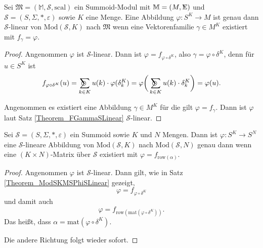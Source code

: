 \documentclass{article}
\DeclareMathOperator*{\Sigmacirc}{%
  \ThisStyle{\mathop{\ensurestackMath{\stackinset{c}{-0.75\LMpt}{c}{}{%
  \rotatebox[origin=lb]{-90}{$\circ$}}{\SavedStyle\Sigma}}}}}
\DeclareMathOperator*{\sumcirc}{%
  \ThisStyle{\mathop{\ensurestackMath{\stackinset{c}{-1.5\LMpt}{c}{}{%
  \rotatebox[origin=lb]{-90}{$\SavedStyle\scalerel*{\bm\Circle}{%
  i}$}}{\SavedStyle\sum}}}}}
\begin{document}
\begin{theorem}\label{Theorem_ModSKMSPhiSLinear}
  Sei $\mathfrak{M} = (\mathbb{M}, \mathcal{S}, \text{scal})$ ein Summoid-Modul
  mit $\mathbb{M} = (M, \Sigmacirc)$ und $\mathcal{S} = (S, \Sigma, \ast, \varepsilon)$
  sowie $K$ eine Menge.
  Eine Abbildung $\varphi \colon S^K \to M$ ist genau dann $\mathcal{S}$-linear von
  $\text{Mod}(\mathcal{S}, K)$ nach $\mathfrak{M}$ wenn eine Vektorenfamilie
  $\gamma \in M^K$ existiert mit $f_\gamma = \varphi$.
\end{theorem}
\begin{proof}
  Angenommen $\varphi$ ist $\mathcal{S}$-linear.
  Dann ist $\varphi = f_{\varphi \circ \delta^K}$, also $\gamma = \varphi \circ \delta^K$,
  denn für $u \in S^K$ ist
  \begin{equation*}
    f_{\varphi \circ \delta^K}(u)
    = \sumcirc_{k \in K} u(k) \cdot \varphi(\delta^K_k)
    = \varphi \bigg( \sumcirc_{k \in K} u(k) \cdot \delta^K_k \bigg)
    = \varphi(u).
  \end{equation*}

  Angenommen es existiert eine Abbildung $\gamma \in M^K$ für die gilt $\varphi = f_\gamma$.
  Dann ist $\varphi$ laut Satz \ref{Theorem_FGammaSLinear} $\mathcal{S}$-linear.
\end{proof}

\begin{theorem}
  Sei $\mathcal{S} = (S, \Sigma, \ast, \varepsilon)$ ein Summoid
  sowie $K$ und $N$ Mengen.
  Dann ist $\varphi \colon S^K \to S^N$ eine $\mathcal{S}$-lineare Abbildung von $\text{Mod}(\mathcal{S}, K)$
  nach $\text{Mod}(\mathcal{S}, N)$ genau dann wenn
  eine $(K \times N)$-Matrix über $\mathcal{S}$ existiert mit $\varphi = f_{\text{row}(\alpha)}$.
\end{theorem}
\begin{proof}
  Angenommen $\varphi$ ist $\mathcal{S}$-linear. 
  Dann gilt, wie in Satz \ref{Theorem_ModSKMSPhiSLinear} gezeigt,
  \begin{equation*}
    \varphi = f_{\varphi \circ \delta^K}
  \end{equation*}
  und damit auch
  \begin{equation*}
    \varphi = f_{\text{row}(\text{mat}(\varphi \circ \delta^K))}.
  \end{equation*}
  Das heißt, dass $\alpha = \text{mat}(\varphi \circ \delta^K)$.

  Die andere Richtung folgt wieder sofort.
\end{proof}
\end{document}
